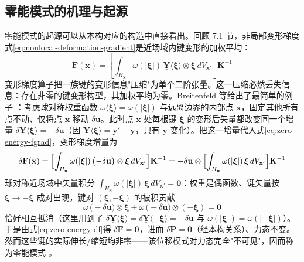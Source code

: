 \subsection{零能模式的机理与起源}\label{sec:zero-energy-mechanism}

零能模式的起源可以从本构对应的构造中直接看出。回顾 7.1 节，非局部变形梯度式\eqref{eq:nonlocal-deformation-gradient}是近场域内键变形的加权平均：
\begin{equation}
  \mathbf{F}(\mathbf{x})
  =\left[\int_{H_{\mathbf{x}}}\omega(|\boldsymbol{\xi}|)\,
    \underline{\mathbf{Y}}\langle\boldsymbol{\xi}\rangle\otimes\boldsymbol{\xi}\,dV_{\mathbf{x}'}\right]\mathbf{K}^{-1}
  \label{eq:zero-energy-fgrad}
\end{equation}
变形梯度算子把一族键的变形信息"压缩"为单个二阶张量。这一压缩必然丢失信息：存在非零的键变形构型，其加权平均为零。Breitenfeld 等给出了最简单的例子 \cite{Breitenfeld2014}：考虑球对称权重函数 $\omega\langle\boldsymbol{\xi}\rangle=\omega(|\boldsymbol{\xi}|)$ 与远离边界的内部点 $\mathbf{x}$，固定其他所有点不动、仅将点 $\mathbf{x}$ 移动 $\delta\mathbf{u}$。此时点 $\mathbf{x}$ 处每根键 $\boldsymbol{\xi}$ 的变形后矢量都改变同一个增量 $\delta\underline{\mathbf{Y}}\langle\boldsymbol{\xi}\rangle=-\delta\mathbf{u}$（因 $\underline{\mathbf{Y}}\langle\boldsymbol{\xi}\rangle=\mathbf{y}'-\mathbf{y}$，只有 $\mathbf{y}$ 变化）。把这一增量代入式\eqref{eq:zero-energy-fgrad}，变形梯度增量为
\begin{equation}
  \delta\mathbf{F}(\mathbf{x})
  =\Bigl[\int_{H_{\mathbf{x}}}\omega(|\boldsymbol{\xi}|)\,
  \bigl(-\delta\mathbf{u}\bigr)\otimes\boldsymbol{\xi}\,dV_{\mathbf{x}'}\Bigr]\mathbf{K}^{-1}
  =-\delta\mathbf{u}\otimes\Bigl[\int_{H_{\mathbf{x}}}\omega(|\boldsymbol{\xi}|)\,\boldsymbol{\xi}\,dV_{\mathbf{x}'}\Bigr]\mathbf{K}^{-1}
  \label{eq:zero-energy-df}
\end{equation}
球对称近场域中矢量积分 $\int_{H_{\mathbf{x}}}\omega(|\boldsymbol{\xi}|)\,\boldsymbol{\xi}\,dV_{\mathbf{x}'}=\mathbf{0}$：权重是偶函数、键矢量按 $\boldsymbol{\xi}\to-\boldsymbol{\xi}$ 成对出现，键对 $(\boldsymbol{\xi},-\boldsymbol{\xi})$ 的被积贡献
\begin{equation}
  \omega\,\bigl(-\delta\mathbf{u}\bigr)\otimes\boldsymbol{\xi}
  +\omega\,\bigl(-\delta\mathbf{u}\bigr)\otimes(-\boldsymbol{\xi})=\mathbf{0}
  \label{eq:zero-energy-pair-cancel}
\end{equation}
恰好相互抵消（这里用到了 $\delta\underline{\mathbf{Y}}\langle\boldsymbol{\xi}\rangle=\delta\underline{\mathbf{Y}}\langle-\boldsymbol{\xi}\rangle=-\delta\mathbf{u}$ 与 $\omega(|\boldsymbol{\xi}|)=\omega(|-\boldsymbol{\xi}|)$）。于是由式\eqref{eq:zero-energy-df}得 $\delta\mathbf{F}=\mathbf{0}$，进而 $\delta\mathbf{P}=\mathbf{0}$（经本构关系）、力态不变。然而这些键的实际伸长/缩短均非零——该位移模式对力态完全"不可见"，因而称为零能模式 \cite{Breitenfeld2014}。

